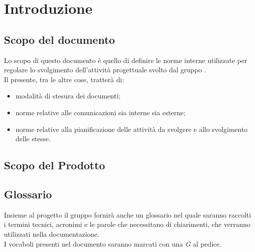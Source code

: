 \section{Introduzione}

\subsection{Scopo del documento}

Lo scopo di questo documento è quello di definire le norme interne utilizzate per regolare lo svolgimento dell'attività progettuale \ProjectName\space svolto dal gruppo \GroupName.\\
Il presente, tra le altre cose, tratterà di:
\begin{itemize}
\item modalità di stesura dei documenti;
\item norme relative alle comunicazioni sia interne sia esterne;
\item norme relative alla pianificazione delle attività da svolgere e allo svolgimento delle stesse.
\end{itemize}

\subsection{Scopo del Prodotto}
\ScopoDelProdotto

\subsection{Glossario}
Insieme al progetto il gruppo fornirà anche un glossario nel quale saranno raccolti i termini tecnici, acronimi e le parole che necessitano di chiarimenti, che verranno utilizzati nella documentazione.\\
I vocaboli presenti nel documento \Glossario\space saranno marcati con una \textit{G} al pedice.






